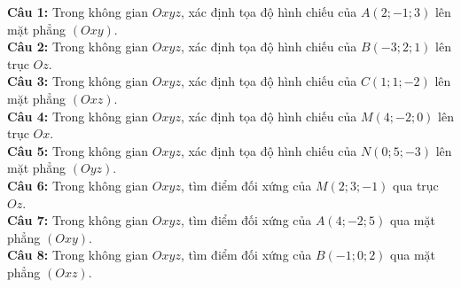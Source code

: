 \documentclass[12pt]{article}
\begin{document}
	\begin{btdo}
		\noindent \textbf{Câu 1:} Trong không gian $Oxyz$, xác định tọa độ hình chiếu của $A(2; -1; 3)$ lên mặt phẳng $(Oxy)$. \\
		\noindent \textbf{Câu 2:} Trong không gian $Oxyz$, xác định tọa độ hình chiếu của $B(-3; 2; 1)$ lên trục $Oz$. \\
		\noindent \textbf{Câu 3:} Trong không gian $Oxyz$, xác định tọa độ hình chiếu của $C(1; 1; -2)$ lên mặt phẳng $(Oxz)$. \\
		\noindent \textbf{Câu 4:} Trong không gian $Oxyz$, xác định tọa độ hình chiếu của $M(4; -2; 0)$ lên trục $Ox$. \\
		\noindent \textbf{Câu 5:} Trong không gian $Oxyz$, xác định tọa độ hình chiếu của $N(0; 5; -3)$ lên mặt phẳng $(Oyz)$. \\
		\noindent \textbf{Câu 6:} Trong không gian $Oxyz$, tìm điểm đối xứng của $M(2; 3; -1)$ qua trục $Oz$. \\
		\noindent \textbf{Câu 7:} Trong không gian $Oxyz$, tìm điểm đối xứng của $A(4; -2; 5)$ qua mặt phẳng $(Oxy)$. \\
		\noindent \textbf{Câu 8:} Trong không gian $Oxyz$, tìm điểm đối xứng của $B(-1; 0; 2)$ qua mặt phẳng $(Oxz)$.
	\end{btdo}
\end{document}
